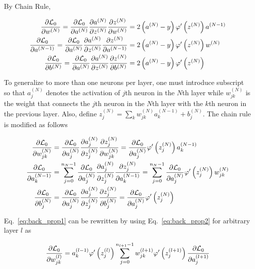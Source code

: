 By Chain Rule,

\begin{align}
    \pdv{\mathcal{L}_0}{w^{(N)}}		      =
    \pdv{\mathcal{L}_0}{a^{(N)}}
    \pdv{a^{(N)}}{z^{(N)}} \pdv{z^{(N)}}{w^{(N)}}    & = 2 \left(a^{(N)} - y
    \right)
    \varphi'
    \left( z^{(N)} \right)  a^{(N-1)}
    \\
    \pdv{\mathcal{L}_0}{a^{(N-1)}}		      =
    \pdv{\mathcal{L}_0}{a^{(N)}}
    \pdv{a^{(N)}}{z^{(N)}} \pdv{z^{(N)}}{a^{(N-1)} } & = 2 \left(a^{(N)} - y
    \right)
    \varphi'
    \left( z^{(N)} \right)  w^{(N)}
    \\
    \pdv{\mathcal{L}_0}{b^{(N)}}		      =
    \pdv{\mathcal{L}_0}{a^{(N)}}
    \pdv{a^{(N)}}{z^{(N)}} \pdv{z^{(N)}}{b^{(N)}}    & = 2 \left(a^{(N)} - y
    \right)
    \varphi'
    \left( z^{(N)} \right)
\end{align}

To generalize to more than one neurons per layer, one must introduce subscript
so that $a^{(N)}_j$ denotes the activation of  $j$th neuron in the $N$th layer
while $w^{(N)}_{jk}$ is the weight that connects the $j$th neuron in the $N$th
layer with the $k$th neuron in the previous layer. Also, define $z^{(N)}_j =
    \sum_k
    w^{(N)}_{jk} a^{(N-1)}_k + b^{(N)}_j$. The chain rule is modified as
follows

\begin{align}
    \pdv{\mathcal{L}_0}{w^{(N)}_{jk}} & =
    \pdv{\mathcal{L}_0}{a^{(N)}_j}
    \pdv{a^{(N)}_j}{z^{(N)}_j} \pdv{z^{(N)}_j}{w^{(N)}_{jk}}  =
    \pdv{\mathcal{L}_0}{a^{(N)}_j}
    \varphi'
    \left( z^{(N)}_j \right)  a^{(N-1)}_k
    \label{eq:back_prop1}
    \\
    \pdv{\mathcal{L}_0}{a^{(N-1)}_k}  & = \sum_{j=0}^{n_N-1}
    \pdv{\mathcal{L}_0}{a^{(N)}_j}
    \pdv{a^{(N)}_j}{z^{(N)}_j} \pdv{z^{(N)}_j}{a^{(N-1)}_k }  =
    \sum_{j=0}^{n_N-1} \pdv{\mathcal{L}_0}{a^{(N)}_j}
    \varphi'
    \left( z^{(N)}_j \right)  w^{(N)}_{jk}
    \label{eq:back_prop2}
    \\
    \pdv{\mathcal{L}_0}{b^{(N)}_j}    & =
    \pdv{\mathcal{L}_0}{a^{(N)}_j}
    \pdv{a^{(N)}_j}{z^{(N)}_j} \pdv{z^{(N)}_j}{b^{(N)}_j}     =
    \pdv{\mathcal{L}_0}{a^{(N)}_j}
    \varphi'
    \left( z^{(N)}_j \right)
\end{align}

Eq.~\eqref{eq:back_prop1} can be rewritten by using
Eq.~\eqref{eq:back_prop2} for arbitrary layer $l$ as

\begin{equation}
    \pdv{\mathcal{L}_0}{w^{(l)}_{jk}} =  a^{(l-1)}_k \varphi'\left( z^{(l)}_j
    \right) \sum_{j=0}^{n_{l+1}-1}
    w^{(l+1)}_{jk} \varphi'
    \left( z^{(l+1)}_j \right)	 \pdv{\mathcal{L}_0}{a^{(l+1)}_j}
\end{equation}

